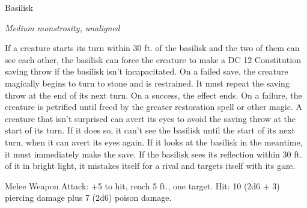 \begin{monsterbox}{Basilisk}
\begin{hangingpar}
\textit{Medium monstrosity, unaligned}
\end{hangingpar}
\dndline%
\basics[%
armorclass = 12,
hitpoints = 8d8 + 16,
speed = {20 ft.}
]
\dndline%
\stats[%
STR = \stat{16},
DEX = \stat{8},
CON = \stat{15},
INT = \stat{2},
WIS = \stat{8},
CHA = \stat{7}
]
\dndline%
\details[%
skills={},
damageimmunities={},
savingthrows={},
conditionimmunities={},
damageresistances={},
damagevulnerabilities={},
senses={darkvision 60 ft., passive Perception 9},
challenge=3
]
\dndline%
\begin{monsteraction}
If a creature starts its turn within 30 ft. of the basilisk and the two of them can see each other, the basilisk can force the creature to make a DC 12 Constitution saving throw if the basilisk isn't incapacitated. On a failed save, the creature magically begins to turn to stone and is restrained. It must repeat the saving throw at the end of its next turn. On a success, the effect ends. On a failure, the creature is petrified until freed by the greater restoration spell or other magic.
A creature that isn't surprised can avert its eyes to avoid the saving throw at the start of its turn. If it does so, it can't see the basilisk until the start of its next turn, when it can avert its eyes again. If it looks at the basilisk in the meantime, it must immediately make the save.
If the basilisk sees its reflection within 30 ft. of it in bright light, it mistakes itself for a rival and targets itself with its gaze.
\end{monsteraction}
\begin{monsteraction}[Bite]
Melee Weapon Attack: +5 to hit, reach 5 ft., one target. Hit: 10 (2d6 + 3) piercing damage plus 7 (2d6) poison damage.
\end{monsteraction}
\end{monsterbox}